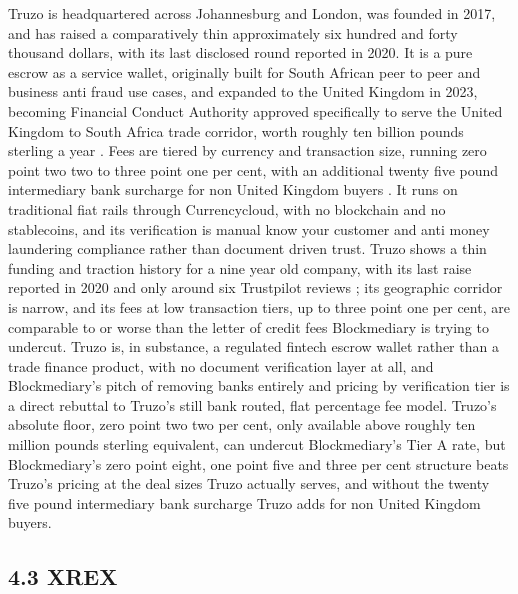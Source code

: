 \documentclass[12pt, a4paper]{article}
\begin{document}
Truzo is headquartered across Johannesburg and London, was founded in 2017, and has raised
a comparatively thin approximately six hundred and forty thousand dollars, with its last
disclosed round reported in 2020. It is a pure escrow as a service wallet, originally
built for South African peer to peer and business anti fraud use cases, and expanded to
the United Kingdom in 2023, becoming Financial Conduct Authority approved specifically to
serve the United Kingdom to South Africa trade corridor, worth roughly ten billion pounds
sterling a year \citep{truzouklaunch2023}. Fees are tiered by currency and transaction
size, running zero point two two to three point one per cent, with an additional twenty
five pound intermediary bank surcharge for non United Kingdom buyers \citep{truzofees}. It
runs on traditional fiat rails through Currencycloud, with no blockchain and no
stablecoins, and its verification is manual know your customer and anti money laundering
compliance rather than document driven trust. Truzo shows a thin funding and traction
history for a nine year old company, with its last raise reported in 2020 and only around
six Trustpilot reviews \citep{truzotrustpilot}; its geographic corridor is narrow, and its
fees at low transaction tiers, up to three point one per cent, are comparable to or worse
than the letter of credit fees Blockmediary is trying to undercut. Truzo is, in substance,
a regulated fintech escrow wallet rather than a trade finance product, with no document
verification layer at all, and Blockmediary's pitch of removing banks entirely and pricing
by verification tier is a direct rebuttal to Truzo's still bank routed, flat percentage
fee model. Truzo's absolute floor, zero point two two per cent, only available above
roughly ten million pounds sterling equivalent, can undercut Blockmediary's Tier A rate,
but Blockmediary's zero point eight, one point five and three per cent structure beats
Truzo's pricing at the deal sizes Truzo actually serves, and without the twenty five pound
intermediary bank surcharge Truzo adds for non United Kingdom buyers.

\subsection*{4.3 XREX}
\end{document}
